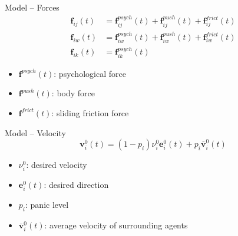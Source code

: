 \documentclass[aspectratio=43]{beamer}
\begin{document}
\begin{frame}{Model -- Forces}
	\begin{equation*}
	\begin{split}
		\bm{f}_{ij}(t) & = \bm{f}_{ij}^{psych}(t) + \bm{f}_{ij}^{push}(t) + \bm{f}_{ij}^{frict}(t) \\[0.5em]
		\bm{f}_{iw}(t) & = \bm{f}_{iw}^{psych}(t) + \bm{f}_{iw}^{push}(t) + \bm{f}_{iw}^{frict}(t) \\[0.5em]
		\bm{f}_{ik}(t) & =\bm{f}_{ik}^{psych}(t)
	\end{split}
	\end{equation*}
	
	\vfill
	
	\begin{itemize}
		\item $\bm{f}^{psych}(t)$: psychological force
		\smallskip
		\item $\bm{f}^{push}(t)$: body force
		\smallskip
		\item $\bm{f}^{frict}(t)$: sliding friction force
	\end{itemize}
\end{frame}


\begin{frame}{Model -- Velocity}
	\begin{equation*}
		\bm{v}_i^0(t) = (1-p_i) \nu_i^0 \bm{e}_i^0(t) + p_i \bar{\bm{v}}_i^0(t)
	\end{equation*}
	
	\vfill
	
	\begin{itemize}
		\item $\nu_i^0$: desired velocity
		\smallskip
		\item $\bm{e}_i^0(t)$: desired direction
		\smallskip
		\item $p_i$: panic level
		\smallskip
		\item $\bar{\bm{v}}_i^0(t)$: average velocity of surrounding agents
	\end{itemize}
\end{frame}
\end{document}
